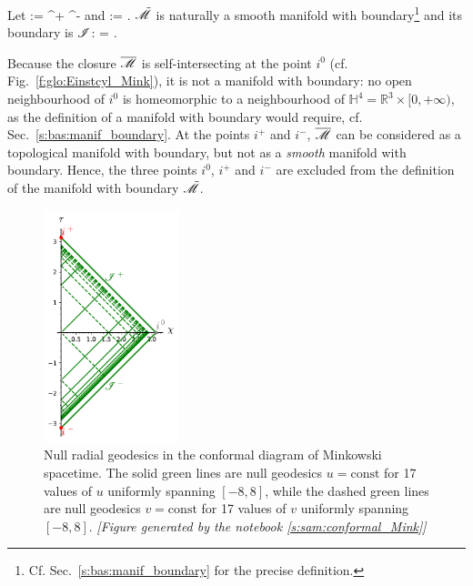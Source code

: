 Let
\be
    \scri := \scri^+ \cup \scri^-
\ee
and
\be \label{e:glo:def_tM_Mink}
    \tilde{\M} := \M \cup \scri .
\ee
$\tilde{\mathscr{M}}$ is naturally a smooth manifold with
boundary\footnote{Cf. Sec.~\ref{s:bas:manif_boundary} for the precise definition.}
and its boundary is $\mathscr{I}$:
\be
    \partial \tilde{\M} = \scri.
\ee
\begin{remark}
Because the closure $\overline{\mathscr{M}}$ is self-intersecting at the point $i^0$
(cf. Fig.~\ref{f:glo:Einstcyl_Mink}), it is not a manifold with boundary: no open neighbourhood of
$i^0$ is homeomorphic to a neighbourhood of
$\mathbb{H}^4 = \mathbb{R}^3\times {[0,+\infty)}$,
as the definition of a manifold with boundary would
require, cf. Sec.~\ref{s:bas:manif_boundary}.
At the points $i^+$ and $i^-$, $\overline{\mathscr{M}}$ can be considered as a
topological manifold with boundary, but not as a \emph{smooth} manifold with boundary.
Hence, the three points $i^0$, $i^+$ and $i^-$ are excluded from the definition
of the manifold with boundary $\tilde{\mathscr{M}}$.
\end{remark}

\begin{figure}
\centerline{\includegraphics[width=0.35\textwidth]{glo_conf_Mink_null.pdf}}
\caption[]{\label{f:glo:conf_Mink_null}\footnotesize
Null radial geodesics in the conformal diagram of Minkowski spacetime.
The solid green lines are null geodesics $u=\mathrm{const}$ for
17 values of $u$ uniformly spanning $[-8,8]$, while the dashed green lines are
null geodesics $v=\mathrm{const}$ for 17 values of $v$ uniformly spanning $[-8,8]$.
\textsl{[Figure generated by the notebook \ref{s:sam:conformal_Mink}]}
}
\end{figure}


